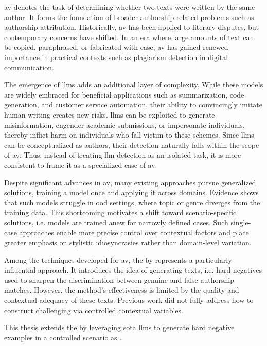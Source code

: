 \Acf{av} denotes the task of determining whether two texts were written by the same author. 
It forms the foundation of broader authorship-related problems such as authorship attribution. 
Historically, \ac{av} has been applied to literary disputes, but contemporary concerns have shifted. 
In an era where large amounts of text can be copied, paraphrased, or fabricated with ease, \ac{av} has gained renewed importance in practical contexts such as plagiarism detection in digital communication.

The emergence of \acp{llm} adds an additional layer of complexity. 
While these models are widely embraced for beneficial applications such as summarization, code generation, and customer service automation, their ability to convincingly imitate human writing creates new risks. 
\acp{llm} can be exploited to generate misinformation, engender academic submissions, or impersonate individuals, thereby inflict harm on individuals who fall victim to these schemes. 
Since \acp{llm} can be conceptualized as authors, their detection naturally falls within the scope of \ac{av}. 
Thus, instead of treating \ac{llm} detection as an isolated task, it is more consistent to frame it as a specialized case of \ac{av}.

Despite significant advances in \ac{av}, many existing approaches pursue generalized solutions, training a model once and applying it across domains. 
Evidence shows that such models struggle in \ac{ood} settings, where topic or genre diverges from the training data. 
This shortcoming motivates a shift toward scenario-specific solutions, i.e. models are trained anew for narrowly defined cases. 
Such single-case approaches enable more precise control over contextual factors and place greater emphasis on stylistic idiosyncrasies rather than domain-level variation.

Among the techniques developed for \ac{av}, the \impAppr{} by \citet{koppel_determining_2014} represents a particularly influential approach. 
It introduces the idea of generating \imp{} texts, i.e. hard negatives used to sharpen the discrimination between genuine and false authorship matches. 
However, the method's effectiveness is limited by the quality and contextual adequacy of these \imp{} texts. 
Previous work did not fully address how to construct challenging \imps{} via controlled contextual variables.

This thesis extends the \impAppr{} by leveraging \acl{sota} \acp{llm} to generate hard negative examples in a controlled scenario as \imps{}. 

